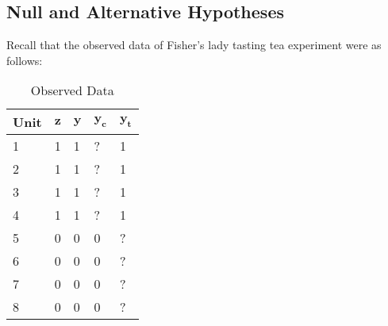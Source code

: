 \documentclass[12pt,leqno]{article}
\theoremstyle{newstyle}
\begin{document}
\hypertarget{null-and-alternative-hypotheses}{%
\subsection{Null and Alternative
Hypotheses}\label{null-and-alternative-hypotheses}}

Recall that the observed data of Fisher's lady tasting tea experiment
were as follows:

\begin{table}[H]
\centering
    \begin{tabular}{l|l|l|l|l}
    Unit & $\mathbf{z}$ & $\mathbf{y}$ & $\mathbf{y_c}$ & $\mathbf{y_t}$ \\ \hline
    1    & 1            & 1            & ?                & 1 \\
    2    & 1            & 1            & ?                & 1  \\
    3    & 1            & 1            & ?                & 1  \\
    4    & 1            & 1            & ?                & 1  \\
    5    & 0            & 0            & 0                & ?  \\
    6    & 0            & 0            & 0                & ?  \\
    7    & 0            & 0            & 0                & ?  \\
    8    & 0            & 0            & 0                & ?  \\
    \end{tabular}
    \caption{Observed Data}
\end{table}
\end{document}
